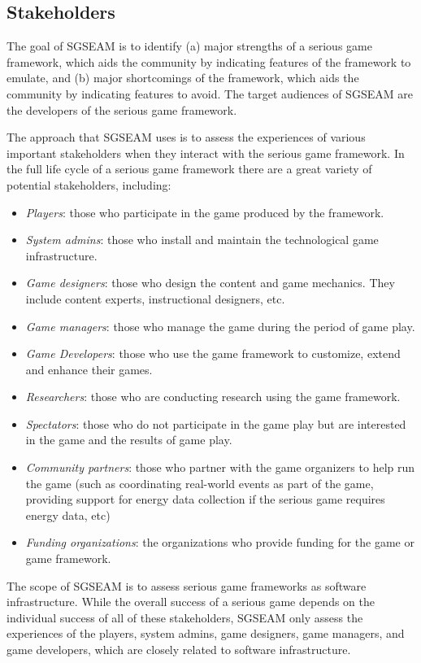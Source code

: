 \documentclass[11pt]{article}
\begin{document}
\subsection{Stakeholders}
The goal of SGSEAM is to identify (a) major strengths of a serious game
framework, which aids the community by indicating features of the framework to emulate, and
(b) major shortcomings of the framework, which aids the community by indicating features to avoid.
The target audiences of SGSEAM are the developers of the serious game framework.

The approach that SGSEAM uses is to assess the experiences of various important stakeholders when
they interact with the serious game framework. In the full life cycle of a serious game framework
there are a great variety of potential stakeholders, including:

\begin{itemize}
\item \emph{Players}: those who participate in the game produced by the framework.
\item \emph{System admins}: those who install and maintain the technological game infrastructure.
\item \emph{Game designers}: those who design the content and game mechanics. They include  content experts, instructional designers, etc.
\item \emph{Game managers}: those who manage the game during the period of game play.
\item \emph{Game Developers}: those who use the game framework to customize, extend and enhance their games.
\item \emph{Researchers}: those who are conducting research using the game framework.
\item \emph{Spectators}: those who do not participate in the game play but are interested in the game and the results of game play. 
\item \emph{Community partners}: those who partner with the game organizers to help run the game (such as coordinating real-world events as part of the game, providing support for energy data
  collection if the serious game requires energy data, etc) 
\item \emph{Funding organizations}: the organizations who provide funding for the game or game framework.
\end{itemize}

The scope of SGSEAM is to assess serious game frameworks as software infrastructure. While
the overall success of a serious game depends on the individual success of all of these
stakeholders, SGSEAM only assess the experiences of the players, system admins, game designers, game managers, and game developers, which are closely related to software infrastructure. 
\end{document}
